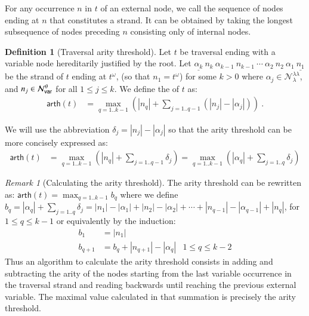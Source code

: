 \documentclass{elsarticle}
\theoremstyle{plain}
\theoremstyle{definition}
\newtheorem{definition}{Definition}[section]
\theoremstyle{remark}
\newtheorem{remark}{Remark}[section]
\newcommand\Nodes{\mathcal{N}}%
\newcommand\NodesVar{\Nodes_{\sf var}}%
\newcommand\NodesLmd{\Nodes_\lambda}%
\newcommand{\ghostlmd}{{\lambda\!\!\lambda}}
\newcommand{\ghostvar}{\theta}
\newcommand\ImNodesVar{\NodesVar^\ghostvar}
\newcommand\ImNodesLmd{\NodesLmd^\ghostlmd}
\newcommand\arth{\textsf{arth}} %
\begin{document}
For any occurrence $n$ in $t$ of an external node, we call  the sequence of nodes ending at $n$ that constitutes a strand. It can be obtained by taking the longest subsequence of nodes preceding $n$ consisting only of internal nodes.

\begin{definition}[Traversal arity threshold]
\label{dfn:arity-threshold}
Let $t$ be traversal ending with a variable node hereditarily justified by the root.
Let $\underline{\alpha_k}\ n_k\ \alpha_{k-1}\ n_{k-1}\ \cdots\ \alpha_2\ n_2\ \alpha_1\ \underline{n_1}$ be the strand of $t$ ending at $t^\omega$, (so that $n_1 = t^\omega$) for some $k>0$  where $\alpha_j \in \ImNodesLmd$, and $n_j \in \ImNodesVar$ for all $1\leq j\leq k$.
We define the  of $t$ as:
\begin{align*}
\arth(t) &= \max_{q=1..k-1} \left( |n_q| + \sum_{j=1..q-1} (|n_j| - |\alpha_j|) \right)\ .
\end{align*}
\end{definition}

We will use the abbreviation $ \delta_j = |n_j| - |\alpha_j|$
so that the arity threshold can be more concisely expressed as:
\begin{align*}
    \arth(t) &= \max_{q=1..k-1} \left( |n_q| + \sum_{j=1..q-1} \delta_j \right)     = \max_{q=1..k-1} \left( |\alpha_q| + \sum_{j=1..q} \delta_j\right)
\end{align*}


\begin{remark}[Calculating the arity threshold]
The arity threshold can be rewritten as:
$\arth(t) = \max_{q=1..k-1} b_q$
where we define $b_q = |\alpha_q| + \sum_{j=1..q} \delta_j = |n_1| - |\alpha_1| + |n_2| - |\alpha_2| + \cdots + |n_{q-1}| - |\alpha_{q-1}| + |n_q|$, for $1\leq q\leq k-1$ or equivalently by the induction:
 \begin{align*}
 b_1 &= |n_1| \\
 b_{q+1} &= b_q + |n_{q+1}| - |\alpha_q| & \mbox{$1 \leq q \leq k-2$}
 \end{align*}
Thus an algorithm to calculate the arity threshold consists in adding and subtracting the arity of the nodes starting from the last variable occurrence in the traversal strand and reading backwards until reaching the previous external variable. The maximal value calculated in that summation is precisely the arity threshold.
\end{remark}
\end{document}
